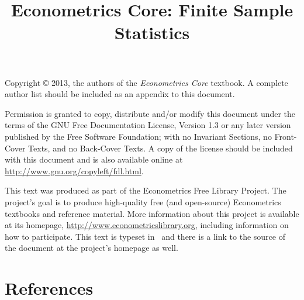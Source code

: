 \documentclass{tex/tufte-handout}
\title{Econometrics Core: Finite Sample Statistics}
\begin{document}
\maketitle

\bigskip\noindent%
Copyright © 2013, the authors of the \textit{Econometrics Core}
textbook.  A complete author list should be included as an appendix to
this document.

Permission is granted to copy, distribute and/or modify this document
under the terms of the GNU Free Documentation License, Version 1.3 or
any later version published by the Free Software Foundation; with no
Invariant Sections, no Front-Cover Texts, and no Back-Cover Texts.  A
copy of the license should be included with this document and is also
available online at \url{http://www.gnu.org/copyleft/fdl.html}.

This text was produced as part of the Econometrics Free Library
Project.  The project's goal is to produce high-quality free (and
open-source) Econometrics textbooks and reference material.  More
information about this project is available at its homepage,
\url{http://www.econometricslibrary.org}, including information on how
to participate.  This text is typeset in \XeLaTeX\ and there is a link
to the source of the document at the project's homepage as well.

%
\tableofcontents















\part*{References}%

\end{document}
